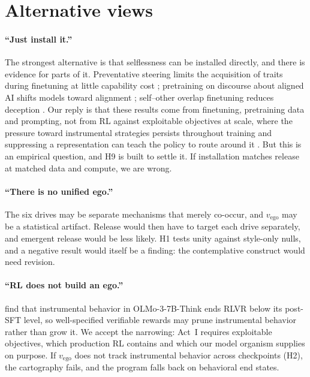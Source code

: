 \documentclass[11pt]{article}
\newcommand{\vego}{v_{\mathrm{ego}}}
\begin{document}
\section{Alternative views}\label{sec:alternatives}

\paragraph{``Just install it.''} The strongest alternative is that selflessness can be installed directly, and there is
evidence for parts of it. Preventative steering limits the acquisition of traits during finetuning at little capability
cost \citep{chen2025persona}; pretraining on discourse about aligned AI shifts models toward alignment
\citep{tice2026pretraining}; self--other overlap finetuning reduces deception \citep{carauleanu2024soo}. Our reply is
that these results come from finetuning, pretraining data and prompting, not from RL against exploitable objectives at
scale, where the pressure toward instrumental strategies persists throughout training and suppressing a representation
can teach the policy to route around it \citep{bailey2024obfuscated}. But this is an empirical question, and H9 is built
to settle it. If installation matches release at matched data and compute, we are wrong.

\paragraph{``There is no unified ego.''} The six drives may be separate mechanisms that merely co-occur, and $\vego$
may be a statistical artifact. Release would then have to target each drive separately, and emergent release would be
less likely. H1 tests unity against style-only nulls, and a negative result would itself be a finding: the contemplative
construct would need revision.

\paragraph{``RL does not build an ego.''} \citet{alparslan2026instrumental} find that instrumental behavior in
OLMo-3-7B-Think ends RLVR below its post-SFT level, so well-specified verifiable rewards may prune instrumental behavior
rather than grow it. We accept the narrowing: Act~I requires exploitable objectives, which production RL contains
\citep{macdiarmid2025natural} and which our model organism supplies on purpose. If $\vego$ does not track instrumental
behavior across checkpoints (H2), the cartography fails, and the program falls back on behavioral end states.
\end{document}

